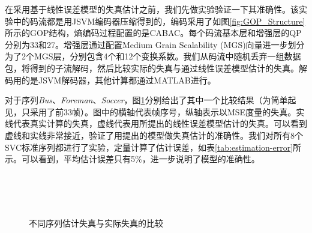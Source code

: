 在采用基于线性误差模型的失真估计之前，我们先做实验验证一下其准确性。该实验中的码流都是用JSVM编码器压缩得到的，编码采用了如图\ref{fig:GOP_Structure}所示的GOP结构，熵编码过程配置的是CABAC。每个码流基本层和增强层的QP分别为33和27。增强层通过配置Medium Grain Scalability (MGS)向量进一步划分为了2个MGS层，分别包含4个和12个变换系数。我们从码流中随机丢弃一组数据包，将得到的子流解码，然后比较实际的失真与通过线性误差模型估计的失真。解码用的是JSVM解码器，其他计算都通过MATLAB进行。

对于序列{\em Bus}、{\em Foreman}、{\em Soccer}，图\ref{fig:model_verification}分别给出了其中一个比较结果（为简单起见，只采用了前33帧）。图中的横轴代表帧序号，纵轴表示以MSE度量的失真。实线代表真实计算的失真，虚线代表用所提出的线性误差模型估计的失真。可以看到虚线和实线非常接近，验证了用提出的模型做失真估计的准确性。我们对所有8个SVC标准序列都进行了实验，定量计算了估计误差，如表\ref{tab:estimation-error}所示。可以看到，平均估计误差只有5\%，进一步说明了模型的准确性。


\begin{figure}[!ht]
	\centering
	 \\
	 \\
	 \\
	\caption{不同序列估计失真与实际失真的比较 \label{fig:model_verification}}
\end{figure}

